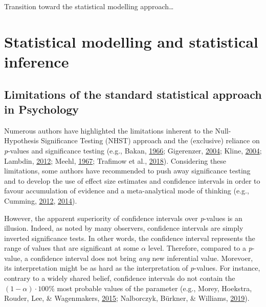 \documentclass[a4paper,12pt,twoside,openright,oldfontcommands]{memoir}
\begin{document}
Transition toward the statistical modelling approach\ldots{}

\section{Statistical modelling and statistical
inference}\label{statistical-modelling-and-statistical-inference}

\subsection{Limitations of the standard statistical approach in
Psychology}\label{limitations-of-the-standard-statistical-approach-in-psychology}

Numerous authors have highlighted the limitations inherent to the
Null-Hypothesis Significance Testing (NHST) approach and the (exclusive)
reliance on \emph{p}-values and significance testing (e.g., Bakan,
\protect\hyperlink{ref-bakan_test_1966}{1966}; Gigerenzer,
\protect\hyperlink{ref-Gigerenzer2004}{2004}; Kline,
\protect\hyperlink{ref-Kline2004}{2004}; Lambdin,
\protect\hyperlink{ref-Lambdin2012}{2012}; Meehl,
\protect\hyperlink{ref-meehl_theory-testing_1967}{1967}; Trafimow et
al., \protect\hyperlink{ref-trafimow_manipulating_2018}{2018}).
Considering these limitations, some authors have recommended to push
away significance testing and to develop the use of effect size
estimates and confidence intervals in order to favour accumulation of
evidence and a meta-analytical mode of thinking (e.g., Cumming,
\protect\hyperlink{ref-Cumming2012}{2012},
\protect\hyperlink{ref-cumming_new_2014}{2014}).

However, the apparent superiority of confidence intervals over
\emph{p}-values is an illusion. Indeed, as noted by many observers,
confidence intervals are simply inverted significance tests. In other
words, the confidence interval represents the range of values that are
significant at some \(\alpha\) level. Therefore, compared to a
\emph{p}-value, a confidence interval does not bring \emph{any} new
inferential value. Morevoer, its interpretation might be as hard as the
interpretation of \emph{p}-values. For instance, contrary to a widely
shared belief, confidence intervals do not contain the
\((1 - \alpha) \cdot 100\)\% most probable values of the parameter
(e.g., Morey, Hoekstra, Rouder, Lee, \& Wagenmakers,
\protect\hyperlink{ref-morey_fallacy_2015}{2015}; Nalborczyk, Bürkner,
\& Williams, \protect\hyperlink{ref-nalborczyk_pragmatism_2019}{2019}).
\end{document}
